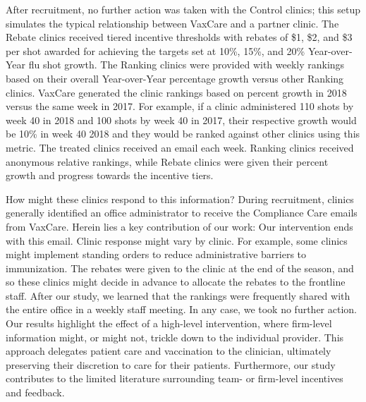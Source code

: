  After recruitment, no further action was taken with the Control clinics; this setup simulates the typical relationship between VaxCare and a partner clinic. The Rebate clinics received tiered incentive thresholds with rebates of \$1, \$2, and \$3 per shot awarded for achieving the targets set at 10\%, 15\%, and 20\% Year-over-Year flu shot growth. The Ranking clinics were provided with weekly rankings based on their overall Year-over-Year percentage growth versus other Ranking clinics. VaxCare generated the clinic rankings based on percent growth in 2018 versus the same week in 2017. For example, if a clinic administered 110 shots by week 40 in 2018 and 100 shots by week 40 in 2017, their respective growth would be 10\% in week 40 2018 and they would be ranked against other clinics using this metric. The treated clinics received an email each week. Ranking clinics received anonymous relative rankings, while Rebate clinics were given their percent growth and progress towards the incentive tiers. 
 
 How might these clinics respond to this information? During recruitment, clinics generally identified an office administrator to receive the Compliance Care emails from VaxCare. Herein lies a key contribution of our work: Our intervention ends with this email. Clinic response might vary by clinic. For example, some clinics might implement standing orders to reduce administrative barriers to immunization. The rebates were given to the clinic at the end of the season, and so these clinics might decide in advance to allocate the rebates to the frontline staff. After our study, we learned that the rankings were frequently shared with the entire office in a weekly staff meeting. In any case, we took no further action. Our results highlight the effect of a high-level intervention, where firm-level information might, or might not, trickle down to the individual provider. This approach delegates patient care and vaccination to the clinician, ultimately preserving their discretion to care for their patients. Furthermore, our study contributes to the limited literature surrounding team- or firm-level incentives and feedback. 
 

